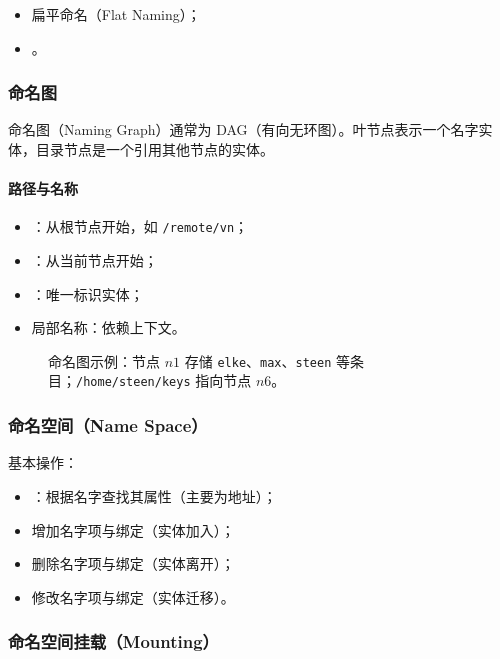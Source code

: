 \begin{itemize}
  \item 扁平命名（Flat Naming）；
  \item {}。
\end{itemize}

\subsubsection{命名图}

命名图（Naming Graph）通常为 DAG（有向无环图）。叶节点表示一个名字实体，目录节点是一个引用其他节点的实体。

\paragraph{路径与名称}
\begin{itemize}
  \item {}：从根节点开始，如 \texttt{/remote/vn}；
  \item {}：从当前节点开始；
  \item {}：唯一标识实体；
  \item 局部名称：依赖上下文。
\end{itemize}

\begin{figure}[H]
  \centering
  \caption{命名图示例：节点 \(n1\) 存储 \texttt{elke}、\texttt{max}、\texttt{steen} 等条目；\texttt{/home/steen/keys} 指向节点 \(n6\)。}
\end{figure}

\subsubsection{命名空间（Name Space）}

基本操作：
\begin{itemize}
  \item {}：根据名字查找其属性（主要为地址）；
  \item 增加名字项与绑定（实体加入）；
  \item 删除名字项与绑定（实体离开）；
  \item 修改名字项与绑定（实体迁移）。
\end{itemize}

\subsubsection{命名空间挂载（Mounting）}


